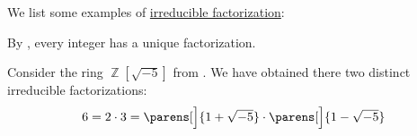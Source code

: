 \begin{example}\label{ex:def:irreducible_factorization}
  We list some examples of \hyperref[def:irreducible_factorization]{irreducible factorization}:
  \begin{thmenum}
     By , every integer has a unique factorization.

     Consider the ring \( \BbbZ[\sqrt{-5}] \) from . We have obtained there two distinct irreducible factorizations:
    \begin{equation*}
      6 = 2 \cdot 3 = \parens[\Big]{ 1 + \sqrt{-5} } \cdot \parens[\Big]{ 1 - \sqrt{-5}}
    \end{equation*}
  \end{thmenum}
\end{example}

